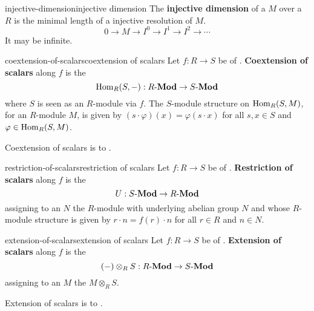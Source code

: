 \begin{topic}{injective-dimension}{injective dimension}
    The \textbf{injective dimension} of a  $M$ over a  $R$ is the minimal length of a injective resolution of $M$.
    \[ 0 \to M \to I^0 \to I^1 \to I^2 \to \cdots \]
    It may be infinite.
\end{topic}

\begin{topic}{coextension-of-scalars}{coextension of scalars}
    Let $f : R \to S$ be  of . \textbf{Coextension of scalars} along $f$ is the 
    \[ \operatorname{Hom}_R(S, -) : R\textup{-}\textbf{Mod} \to S\textup{-}\textbf{Mod} \]
    where $S$ is seen as an $R$-module via $f$. The $S$-module structure on $\operatorname{Hom}_R(S, M)$, for an $R$-module $M$, is given by $(s \cdot \varphi)(x) = \varphi(s \cdot x)$ for all $s, x \in S$ and $\varphi \in \operatorname{Hom}_R(S, M)$.
    
    Coextension of scalars is  to .
\end{topic}

\begin{topic}{restriction-of-scalars}{restriction of scalars}
    Let $f : R \to S$ be  of . \textbf{Restriction of scalars} along $f$ is the 
    \[ U : S\textup{-}\textbf{Mod} \to R\textup{-}\textbf{Mod} \]
    assigning to an  $N$ the $R$-module with underlying abelian group $N$ and whose $R$-module structure is given by $r \cdot n = f(r) \cdot n$ for all $r \in R$ and $n \in N$.
\end{topic}

\begin{topic}{extension-of-scalars}{extension of scalars}
    Let $f : R \to S$ be  of . \textbf{Extension of scalars} along $f$ is the 
    \[ (-) \otimes_R S : R\textup{-}\textbf{Mod} \to S\textup{-}\textbf{Mod} \]
    assigning to an  $M$ the  $M \otimes_R S$.
    
    Extension of scalars is  to .
\end{topic}

